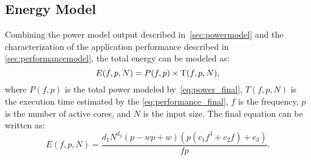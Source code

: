 \subsection{Energy Model} \label{sec:energymodel}
Combining the power model output described in~\cref{sec:powermodel} and the characterization of the application performance described in \cref{sec:performancemodel}, the total energy can be modeled as:
\begin{equation}
E(f,p,N)=P(f,p)\times{\rm T}(f,p,N),
\label{eq:en_combination}
\end{equation}
where $P(f,p)$ is the total power modeled by~\cref{eq:power_final}, ${T}(f,p,N)$ is the execution time estimated by the \cref{eq:performance_final}, $f$ is the frequency, $p$ is the number of active cores, and $N$ is the input size. The final equation can be written as:
\begin{equation}
E(f,p,N)=\frac{d_1N^{d_2}(p-wp+w)(p(c_1f^3+c_2f)+c_3)}{fp}.
\label{eq:en_final}
\end{equation}

